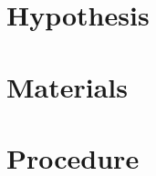 \documentclass{article} %
\newcounter{source}
\begin{document}
\section{Hypothesis}






\section {Materials}











\section {Procedure}
\end{document}
